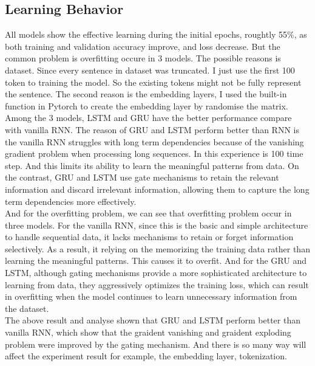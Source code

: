 \documentclass[12pt,a4paper]{article}
\begin{document}
\subsection{Learning Behavior}
All models show the effective learning during the initial epochs, roughtly 55\%, as both training and validation accuracy improve, and loss decrease. But the common problem is overfitting occure in 3 models. The possible reasons is dataset. Since every sentence in dataset was truncated. I just use the first 100 token to training the model. So the existing tokens might not be fully represent the sentence. The second reason is the embedding layers, I used the built-in function in Pytorch to create the embedding layer by randomise the matrix. 
\\[1ex]
Among the 3 models, LSTM and GRU have the better performance compare with vanilla RNN. The reason of GRU and LSTM perform better than RNN is the vanilla RNN struggles with long term dependencies because of the vanishing gradient problem when processing long sequences. In this experience is 100 time step. And this limits its ability to learn the meaningful patterns from data. On the contrast, GRU and LSTM use gate mechanisms to retain the relevant information and discard irrelevant information, allowing them to capture the long term dependencies more effectively.
\\[1ex]
And for the overfitting problem, we can see that overfitting problem occur in three models. For the vanilla RNN, since this is the basic and simple architecture to handle sequential data, it lacks mechanisms to retain or forget information selectively. As a result, it relying on the memorizing the training data rather than learning the meaningful patterns. This causes it to overfit. And for the GRU and LSTM, although gating mechanisms provide a more sophisticated architecture to learning from data, they aggressively optimizes the training loss, which can result in overfitting when the model continues to learn unnecessary information from the dataset. 
\\[1ex] 
The above result and analyse shown that GRU and LSTM perform better than vanilla RNN, which show that the graident vanishing and graident exploding problem were improved by the gating mechanism. And there is so many way will affect the experiment result for example, the embedding layer, tokenization.
\newpage









\printbibliography
\end{document}

